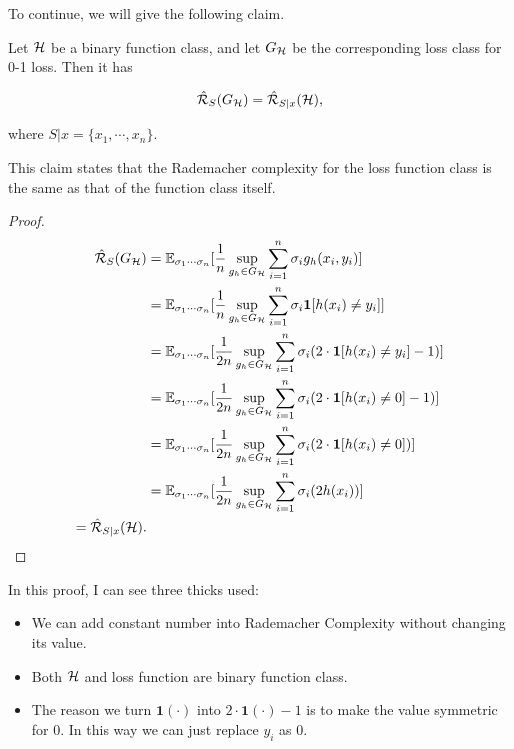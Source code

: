 \documentclass[../main.tex]{subfiles}
\begin{document}
		 To continue, we will give the following claim.
		 
		 \begin{claim}
		 	Let $\mathcal{H}$ be a binary function class, and let $G_{\mathcal{H}}$ be the corresponding loss class for 0-1 loss. Then it has 
		 	
		 	\begin{equation}
			 	\hat{\mathcal{R}}_S(G_{\mathcal{H}}) = \hat{\mathcal{R}}_{S|x} (\mathcal{H}),
		 	\end{equation}
		 	
		 	where $S|x = \{x_1,\cdots, x_n\}$.
		 \end{claim}
		 
		 This claim states that the Rademacher complexity for the loss function class is the same as that of the function class itself.
		 
		 \begin{proof}
		 \begin{equation*}
		 		 \begin{aligned}
		 		 \hat{\mathcal{R}}_S(G_{\mathcal{H}}) &= \mathbb{E}_{\sigma_1 \cdots \sigma_n} [\frac{1}{n} \sup\limits_{g_h \in G_{\mathcal{H}}} \sum\limits_{i=1}^n \sigma_i g_h(x_i,y_i) ] \\
		 		 & = \mathbb{E}_{\sigma_1 \cdots \sigma_n} [\frac{1}{n} \sup\limits_{g_h \in G_{\mathcal{H}}} \sum\limits_{i=1}^n \sigma_i \mathbf{1}[h(x_i) \neq y_i] ] \\
		 		 		 		 & = \mathbb{E}_{\sigma_1 \cdots \sigma_n} [\frac{1}{2n} \sup\limits_{g_h \in G_{\mathcal{H}}} \sum\limits_{i=1}^n \sigma_i (2\cdot\mathbf{1}[h(x_i) \neq y_i] -1) ] \\
		  & = \mathbb{E}_{\sigma_1 \cdots \sigma_n} [\frac{1}{2n} \sup\limits_{g_h \in G_{\mathcal{H}}} \sum\limits_{i=1}^n \sigma_i (2\cdot\mathbf{1}[h(x_i) \neq 0] -1) ] \\
		 		  & = \mathbb{E}_{\sigma_1 \cdots \sigma_n} [\frac{1}{2n} \sup\limits_{g_h \in G_{\mathcal{H}}} \sum\limits_{i=1}^n \sigma_i (2\cdot\mathbf{1}[h(x_i) \neq 0]) ] \\
		 		 & = \mathbb{E}_{\sigma_1 \cdots \sigma_n} [\frac{1}{2n} \sup\limits_{g_h \in G_{\mathcal{H}}} \sum\limits_{i=1}^n \sigma_i (2 h(x_i)) ] \\
		 		 = \hat{\mathcal{R}}_{S|x} (\mathcal{H}).
		 		 \end{aligned}
		 \end{equation*}
		 \end{proof}
		 
		 In this proof, I can see three thicks used:
		 
		 \begin{itemize}
		 \item We can add constant number into Rademacher Complexity without changing its value.
		 \item Both $\mathcal{H}$ and loss function are binary function class.
		 \item The reason we turn $\mathbf{1}(\cdot)$ into $2 \cdot \mathbf{1} (\cdot) - 1$ is to make the value symmetric for $0$. In this way we can just replace $y_i$ as $0$.
		 \end{itemize}
		 
\end{document}
